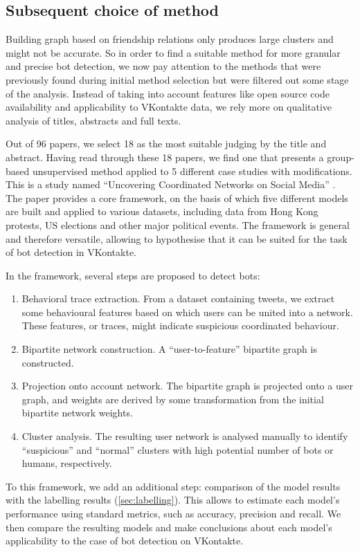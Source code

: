 \subsection{Subsequent choice of method}
Building graph based on friendship relations only produces large clusters and might not be accurate. So in order to find a suitable method for more granular and precise bot detection, we now pay attention to the methods that were previously found during initial method selection but were filtered out some stage of the analysis. Instead of taking into account features like open source code availability and applicability to VKontakte data, we rely more on qualitative analysis of titles, abstracts and full texts. 

Out of 96 papers, we select 18 as the most suitable judging by the title and abstract. Having read through these 18 papers, we find one that presents a group-based unsupervised method applied to 5 different case studies with modifications. This is a study named ``Uncovering Coordinated Networks on Social Media'' \cite{pacheco2020uncovering}. The paper provides a core framework, on the basis of which five different models are built and applied to various datasets, including data from Hong Kong protests, US elections and other major political events. The framework is general and therefore versatile, allowing to hypothesise that it can be suited for the task of bot detection in VKontakte.

In the framework, several steps are proposed to detect bots:
\begin{enumerate}
    \item Behavioral trace extraction. From a dataset containing tweets, we extract some behavioural features based on which users can be united into a network. These features, or traces, might indicate suspicious coordinated behaviour.
    \item Bipartite network construction. A ``user-to-feature'' bipartite graph is constructed.
    \item Projection onto account network. The bipartite graph is projected onto a user graph, and weights are derived by some transformation from the initial bipartite network weights. 
    \item Cluster analysis. The resulting user network is analysed manually to identify ``suspicious'' and ``normal'' clusters with high potential number of bots or humans, respectively.
\end{enumerate}

To this framework, we add an additional step: comparison of the model results with the labelling results (\ref{sec:labelling}). This allows to estimate each model's performance using standard metrics, such as accuracy, precision and recall. We then compare the resulting models and make conclusions about each model's applicability to the case of bot detection on VKontakte.

